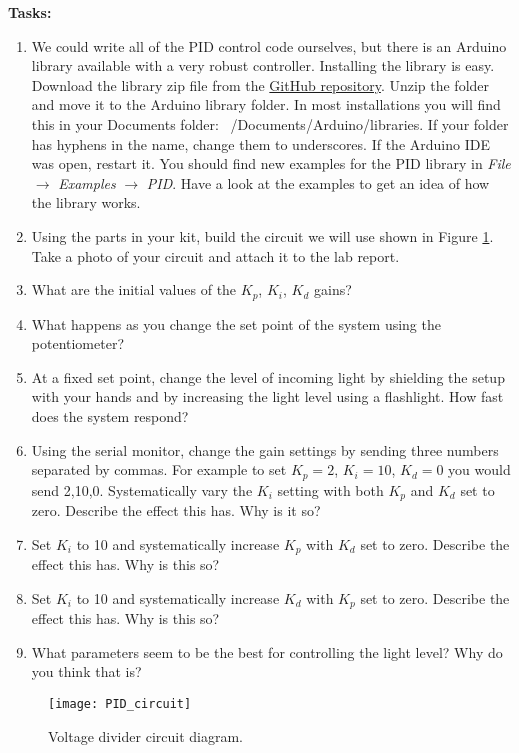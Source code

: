\documentclass[10pt]{article}
\begin{document}
\noindent \textbf{Tasks:}
\begin{enumerate}
	\item We could write all of the PID control code ourselves, but there is an Arduino library available with a very robust controller. Installing the library is easy. Download the library zip file from the \href{https://github.com/br3ttb/Arduino-PID-Library/archive/master.zip}{GitHub repository}. Unzip the folder and move it to the Arduino library folder. In most installations you will find this in your Documents folder: ~/Documents/Arduino/libraries. If your folder has hyphens in the name, change them to underscores. If the Arduino IDE was open, restart it. You should find new examples for the PID library in \textit{File } $ \rightarrow $ \textit{Examples} $ \rightarrow $ \textit{PID}. Have a look at the examples to get an idea of how the library works.
	\item Using the parts in your kit, build the circuit we will use shown in Figure \ref{fig:PID_cirucit}. Take a photo of your circuit and attach it to the lab report. 
	\item What are the initial values of the $ K_p $, $ K_i $, $ K_d $ gains? 
	\item What happens as you change the set point of the system using the potentiometer? 
	\item At a fixed set point, change the level of incoming light by shielding the setup with your hands and by increasing the light level using a flashlight. How fast does the system respond? 
	\item Using the serial monitor, change the gain settings by sending three numbers separated by commas. For example to set $ K_p=2 $, $ K_i=10 $, $ K_d=0 $ you would send 2,10,0. Systematically vary the $ K_i $ setting with both $ K_p $ and $ K_d $ set to zero. Describe the effect this has. Why is it so? 
	\item Set $ K_i $ to 10 and systematically increase $ K_p $ with $ K_d $ set to zero. Describe the effect this has. Why is this so? 
	\item  Set $ K_i $ to 10 and systematically increase $ K_d $ with $ K_p $ set to zero. Describe the effect this has. Why is this so? 
	\item What parameters seem to be the best for controlling the light level? Why do you think that is? 
\end{enumerate}


\newpage

\begin{figure}[ht]
	\centering
	\texttt{[image: PID\_circuit]}
	\caption{Voltage divider circuit diagram.}
	\label{fig:PID_cirucit}
	
\end{figure}
\end{document}
